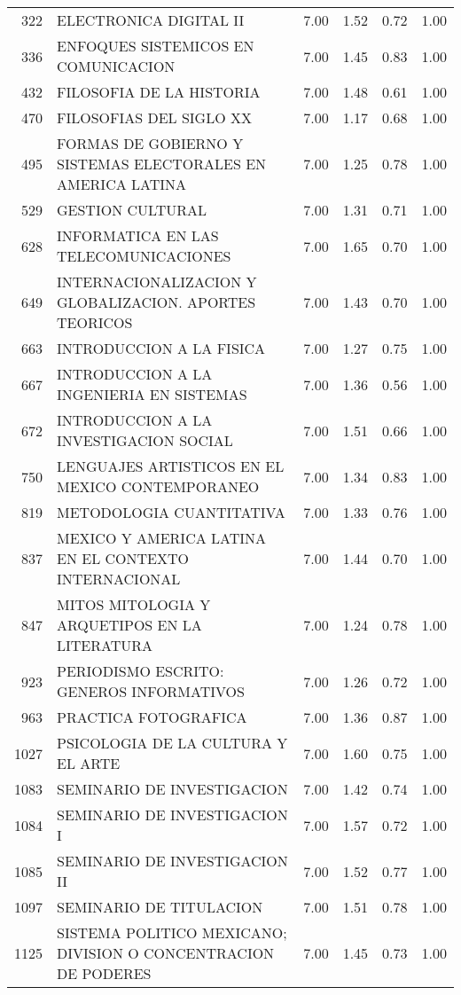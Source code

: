 \documentclass[12pt]{article}
\begin{document}
\begin{table}[ht]
\begin{tabular}{rlrrrr}
  322 & ELECTRONICA DIGITAL II & 7.00 & 1.52 & 0.72 & 1.00 \\ 
  336 & ENFOQUES SISTEMICOS EN COMUNICACION & 7.00 & 1.45 & 0.83 & 1.00 \\ 
  432 & FILOSOFIA DE LA HISTORIA & 7.00 & 1.48 & 0.61 & 1.00 \\ 
  470 & FILOSOFIAS DEL SIGLO XX & 7.00 & 1.17 & 0.68 & 1.00 \\ 
  495 & FORMAS DE GOBIERNO Y SISTEMAS ELECTORALES EN AMERICA LATINA & 7.00 & 1.25 & 0.78 & 1.00 \\ 
  529 & GESTION CULTURAL & 7.00 & 1.31 & 0.71 & 1.00 \\ 
  628 & INFORMATICA EN LAS TELECOMUNICACIONES & 7.00 & 1.65 & 0.70 & 1.00 \\ 
  649 & INTERNACIONALIZACION Y GLOBALIZACION. APORTES TEORICOS & 7.00 & 1.43 & 0.70 & 1.00 \\ 
  663 & INTRODUCCION A LA FISICA & 7.00 & 1.27 & 0.75 & 1.00 \\ 
  667 & INTRODUCCION A LA INGENIERIA EN SISTEMAS & 7.00 & 1.36 & 0.56 & 1.00 \\ 
  672 & INTRODUCCION A LA INVESTIGACION SOCIAL & 7.00 & 1.51 & 0.66 & 1.00 \\ 
  750 & LENGUAJES ARTISTICOS EN EL MEXICO CONTEMPORANEO & 7.00 & 1.34 & 0.83 & 1.00 \\ 
  819 & METODOLOGIA CUANTITATIVA & 7.00 & 1.33 & 0.76 & 1.00 \\ 
  837 & MEXICO Y AMERICA LATINA EN EL CONTEXTO INTERNACIONAL & 7.00 & 1.44 & 0.70 & 1.00 \\ 
  847 & MITOS MITOLOGIA Y ARQUETIPOS EN LA LITERATURA & 7.00 & 1.24 & 0.78 & 1.00 \\ 
  923 & PERIODISMO ESCRITO: GENEROS INFORMATIVOS & 7.00 & 1.26 & 0.72 & 1.00 \\ 
  963 & PRACTICA FOTOGRAFICA & 7.00 & 1.36 & 0.87 & 1.00 \\ 
  1027 & PSICOLOGIA DE LA CULTURA Y EL ARTE & 7.00 & 1.60 & 0.75 & 1.00 \\ 
  1083 & SEMINARIO DE INVESTIGACION & 7.00 & 1.42 & 0.74 & 1.00 \\ 
  1084 & SEMINARIO DE INVESTIGACION I & 7.00 & 1.57 & 0.72 & 1.00 \\ 
  1085 & SEMINARIO DE INVESTIGACION II & 7.00 & 1.52 & 0.77 & 1.00 \\ 
  1097 & SEMINARIO DE TITULACION & 7.00 & 1.51 & 0.78 & 1.00 \\ 
  1125 & SISTEMA POLITICO MEXICANO; DIVISION O CONCENTRACION DE PODERES & 7.00 & 1.45 & 0.73 & 1.00 \\ 

\end{tabular}
\end{table}
\end{document}
